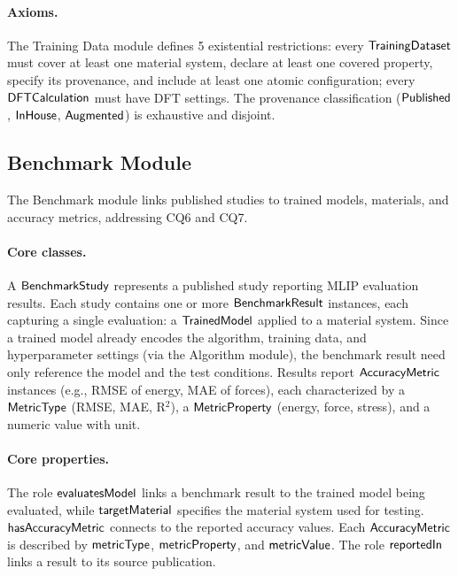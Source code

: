 \paragraph{Axioms.}
The Training Data module defines 5 existential restrictions: every
$\mathsf{TrainingDataset}$ must cover at least one material system, declare at
least one covered property, specify its provenance, and include at least
one atomic configuration; every $\mathsf{DFTCalculation}$ must have DFT settings.
The provenance classification ($\mathsf{Published}$,
$\mathsf{InHouse}$, $\mathsf{Augmented}$) is exhaustive and disjoint.



\subsection{Benchmark Module}
\label{sec:benchmark-module}

The Benchmark module links published studies to trained models, materials,
and accuracy metrics, addressing CQ6 and CQ7.

\paragraph{Core classes.}
A $\mathsf{BenchmarkStudy}$ represents a published study reporting MLIP evaluation
results. Each study contains one or more $\mathsf{BenchmarkResult}$ instances, each
capturing a single evaluation: a $\mathsf{TrainedModel}$ applied to a material
system. Since a trained model already encodes the algorithm, training data,
and hyperparameter settings (via the Algorithm module), the benchmark result
need only reference the model and the test conditions. Results report
$\mathsf{AccuracyMetric}$ instances (e.g., RMSE of energy, MAE of forces), each
characterized by a $\mathsf{MetricType}$ (RMSE, MAE, R$^2$), a $\mathsf{MetricProperty}$
(energy, force, stress), and a numeric value with unit.

\paragraph{Core properties.}
The role $\mathsf{evaluatesModel}$ links a benchmark result to the trained model
being evaluated, while $\mathsf{targetMaterial}$ specifies the material system used
for testing. $\mathsf{hasAccuracyMetric}$ connects to the reported accuracy values.
Each $\mathsf{AccuracyMetric}$ is described by $\mathsf{metricType}$, $\mathsf{metricProperty}$,
and $\mathsf{metricValue}$. The role $\mathsf{reportedIn}$ links a result to its source
publication.

